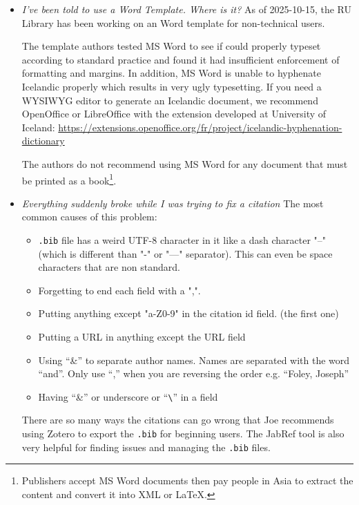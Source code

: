 \begin{itemize}
  \item {\em I've been told to use a Word Template.  Where is it?}
    As of 2025-10-15, the RU Library has been working on an Word template for non-technical users.
     
    The template authors tested MS Word to see if could properly typeset according to standard practice and found it had insufficient enforcement of formatting and margins.
    In addition, MS Word is unable to hyphenate Icelandic properly which results in very ugly typesetting.
    If you need a WYSIWYG editor to generate an Icelandic document, we recommend OpenOffice or LibreOffice with the extension developed at University of Iceland: \url{https://extensions.openoffice.org/fr/project/icelandic-hyphenation-dictionary}

  The authors do not recommend using MS Word for any document that must be printed as a book\footnote{Publishers accept MS Word documents then pay people in Asia to extract the content and convert it into XML or LaTeX.}.

  \item {\em Everything suddenly broke while I was trying to fix a citation}
  The most common causes of this problem:
  \begin{itemize}
      \item \texttt{.bib} file has a weird UTF-8 character in it like a dash character "--"  (which is different than "-" or "---" separator). 
      This can even be space characters that are non standard.
      \item Forgetting to end each field with a ",".  
      \item Putting anything except "a-Z0-9" in the citation id field.  (the first one)
      \item Putting a URL in anything except the URL field
      \item Using ``\&'' to separate author names.  
      Names are separated with the word ``and''.
      Only use ``,'' when you are reversing the order e.g. ``Foley, Joseph''
      \item Having ``\&'' or underscore or ``\verb|\|'' in a field  
   \end{itemize}
   
  There are so many ways the citations can go wrong that Joe recommends using Zotero to export the \texttt{.bib} for beginning users.
  The JabRef tool is also very helpful for finding issues and managing the \texttt{.bib} files.
\end{itemize}

